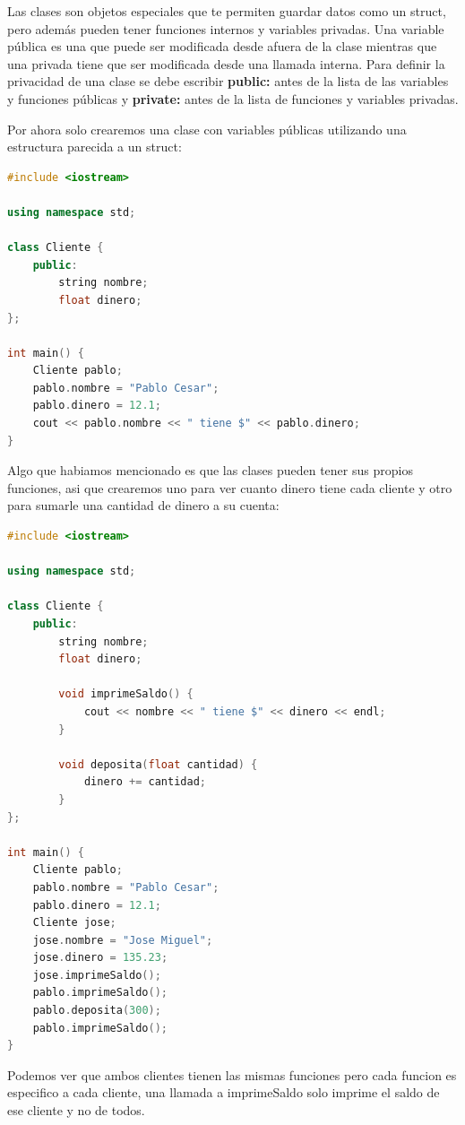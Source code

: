 \documentclass{article}
\begin{document}
Las clases son objetos especiales que te permiten guardar datos como un struct, pero además pueden tener funciones internos y variables privadas. Una variable pública es una que puede ser modificada desde afuera de la clase mientras que una privada tiene que ser modificada desde una llamada interna. Para definir la privacidad de una clase se debe escribir \textbf{public:} antes de la lista de las variables y funciones públicas y \textbf{private:} antes de la lista de funciones y variables privadas.

Por ahora solo crearemos una clase con variables públicas utilizando una estructura parecida a un struct:

\begin{lstlisting}[language=C++, caption=Declarando clases]
#include <iostream>

using namespace std;

class Cliente {
    public:
        string nombre;
        float dinero;
};

int main() {
    Cliente pablo;
    pablo.nombre = "Pablo Cesar";
    pablo.dinero = 12.1;
    cout << pablo.nombre << " tiene $" << pablo.dinero;
}
\end{lstlisting}

Algo que habiamos mencionado es que las clases pueden tener sus propios funciones, asi que crearemos uno para ver cuanto dinero tiene cada cliente y otro para sumarle una cantidad de dinero a su cuenta:

\begin{lstlisting}[language=C++, caption=Funciones internas]
#include <iostream>

using namespace std;

class Cliente {
    public:
        string nombre;
        float dinero;

        void imprimeSaldo() {
            cout << nombre << " tiene $" << dinero << endl;
        }

        void deposita(float cantidad) {
            dinero += cantidad;
        }
};

int main() {
    Cliente pablo;
    pablo.nombre = "Pablo Cesar";
    pablo.dinero = 12.1;
    Cliente jose;
    jose.nombre = "Jose Miguel";
    jose.dinero = 135.23;
    jose.imprimeSaldo();
    pablo.imprimeSaldo();
    pablo.deposita(300);
    pablo.imprimeSaldo();
}
\end{lstlisting}

Podemos ver que ambos clientes tienen las mismas funciones pero cada funcion es especifico a cada cliente, una llamada a imprimeSaldo solo imprime el saldo de ese cliente y no de todos.
\end{document}
